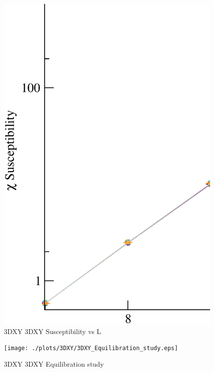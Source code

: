 \begin{figure}[!htpb]
  \centering
  \includegraphics[width=\textwidth]{./plots/3DXY/3DXY_Susceptibility_vs_L.eps}
  \caption{3DXY 3DXY Susceptibility vs L}
\end{figure}

\begin{figure}[!htpb]
  \centering
  \texttt{[image: ./plots/3DXY/3DXY\_Equilibration\_study.eps]}
  \caption{3DXY 3DXY Equilibration study}
\end{figure}

